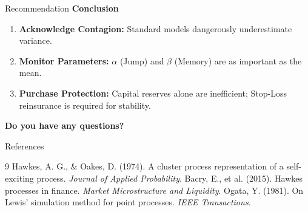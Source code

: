 \documentclass[aspectratio=43, 10pt]{beamer}
\begin{document}
\begin{frame}{Recommendation}
    \textbf{Conclusion}
    
    \begin{enumerate}
        \item \textbf{Acknowledge Contagion:} Standard models dangerously underestimate variance.
        \item \textbf{Monitor Parameters:} $\alpha$ (Jump) and $\beta$ (Memory) are as important as the mean.
        \item \textbf{Purchase Protection:} Capital reserves alone are inefficient; Stop-Loss reinsurance is required for stability.
    \end{enumerate}
    
    \vspace{1cm}
    \centering
    \large \textbf{Do you have any questions?}
\end{frame}

\begin{frame}[allowframebreaks]{References}
    \tiny
    
    \begin{thebibliography}{9}
         Hawkes, A. G., \& Oakes, D. (1974). A cluster process representation of a self-exciting process. \textit{Journal of Applied Probability}.
         Bacry, E., et al. (2015). Hawkes processes in finance. \textit{Market Microstructure and Liquidity}.
         Ogata, Y. (1981). On Lewis' simulation method for point processes. \textit{IEEE Transactions}.
    \end{thebibliography}
\end{frame}
\end{document}
